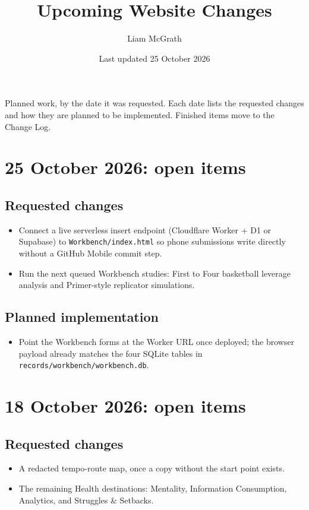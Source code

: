 \documentclass[11pt]{article}
\title{Upcoming Website Changes}
\author{Liam McGrath}
\date{Last updated 25 October 2026}
\begin{document}
\maketitle

Planned work, by the date it was requested. Each date lists the requested changes and how they are planned to be implemented. Finished items move to the Change Log.

\section{25 October 2026: open items}
\subsection{Requested changes}
\begin{itemize}
\item Connect a live serverless insert endpoint (Cloudflare Worker + D1 or Supabase) to \texttt{Workbench/index.html} so phone submissions write directly without a GitHub Mobile commit step.
\item Run the next queued Workbench studies: First to Four basketball leverage analysis and Primer-style replicator simulations.
\end{itemize}
\subsection{Planned implementation}
\begin{itemize}
\item Point the Workbench forms at the Worker URL once deployed; the browser payload already matches the four SQLite tables in \texttt{records/workbench/workbench.db}.
\end{itemize}

\section{18 October 2026: open items}
\subsection{Requested changes}
\begin{itemize}
\item A redacted tempo-route map, once a copy without the start point exists.
\item The remaining Health destinations: Mentality, Information Consumption, Analytics, and Struggles \& Setbacks.
\end{itemize}
\end{document}

